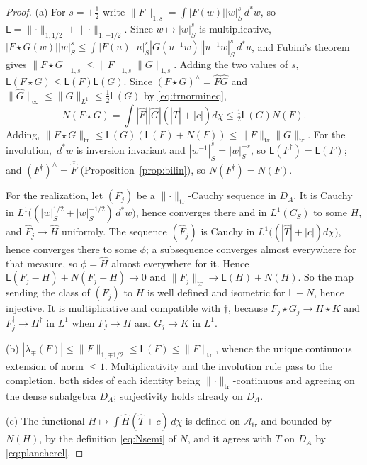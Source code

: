 \documentclass[11pt]{amsart}
\theoremstyle{definition}
\theoremstyle{remark}
\newcommand{\dstar}{\,d^{*}}
\newcommand{\Th}{\widehat{T}}
\newcommand{\DA}{D_A}
\begin{document}
\begin{proof}
(a)  For $s=\pm\tfrac12$ write
$\lVert F\rVert_{1,s}=\int|F(w)||w|_S^{s}\dstar w$, so
$\mathsf L=\lVert\cdot\rVert_{1,1/2}+\lVert\cdot\rVert_{1,-1/2}$.  Since
$w\mapsto|w|_S^{s}$ is multiplicative,
$|F\star G(w)||w|_S^{s}\le\int|F(u)||u|_S^{s}|G(u^{-1}w)|
|u^{-1}w|_S^{s}\dstar u$,
and Fubini's theorem gives
$\lVert F\star G\rVert_{1,s}\le\lVert F\rVert_{1,s}
\lVert G\rVert_{1,s}$.  Adding the two values of $s$,
$\mathsf L(F\star G)\le\mathsf L(F)\mathsf L(G)$.  Since $(F\star G)^{\wedge}=
\widehat F\widehat G$ and $\lVert\widehat G\rVert_{\infty}\le\lVert
G\rVert_{L^{1}}\le\tfrac12\mathsf L(G)$ by \eqref{eq:trnormineq},
\[
N(F\star G)=\int|\widehat F||\widehat G|(|\Th|+|c|)d\chi
\le\tfrac12\mathsf L(G)N(F).
\]
Adding, $\lVert F\star G\rVert_{\mathrm{tr}}\le\mathsf L(G)
(\mathsf L(F)+N(F))\le\lVert F\rVert_{\mathrm{tr}}\lVert G\rVert_{\mathrm{tr}}$.
For the involution, $\dstar w$ is inversion invariant and
$|w^{-1}|_S^{s}=|w|_S^{-s}$, so $\mathsf L(F^{\dagger})=\mathsf L(F)$;
and $(F^{\dagger})^{\wedge}=\overline{\widehat F}$
(Proposition~\ref{prop:bilin}), so $N(F^{\dagger})=N(F)$.

For the realization, let $(F_j)$ be a
$\lVert\cdot\rVert_{\mathrm{tr}}$-Cauchy sequence in $\DA$.  It is Cauchy in
$L^{1}\bigl((|w|_S^{1/2}+|w|_S^{-1/2})\dstar w\bigr)$, hence converges there
and in $L^{1}(C_S)$ to some $H$, and $\widehat F_j\to\widehat H$ uniformly.
The sequence $(\widehat F_j)$ is Cauchy in
$L^{1}\bigl((|\Th|+|c|)d\chi\bigr)$, hence converges there to some $\phi$; a
subsequence converges almost everywhere for that measure, so
$\phi=\widehat H$ almost everywhere for it.  Hence
$\mathsf L(F_j-H)+N(F_j-H)\to0$ and
$\lVert F_j\rVert_{\mathrm{tr}}\to\mathsf L(H)+N(H)$.  So the map sending the
class of $(F_j)$ to $H$ is well defined and isometric for $\mathsf L+N$, hence
injective.  It is multiplicative and compatible with $\dagger$, because
$F_j\star G_j\to H\star K$ and $F_j^{\dagger}\to H^{\dagger}$ in $L^{1}$ when
$F_j\to H$ and $G_j\to K$ in $L^{1}$.

(b)  $|\lambda_{\mp}(F)|\le\lVert F\rVert_{1,\mp1/2}\le\mathsf L(F)\le
\lVert F\rVert_{\mathrm{tr}}$, whence the unique continuous extension of norm
$\le1$.  Multiplicativity and the involution rule pass to the completion,
both sides of each identity being $\lVert\cdot\rVert_{\mathrm{tr}}$-continuous
and agreeing on the dense subalgebra $\DA$; surjectivity holds already on
$\DA$.

(c)  The functional $H\mapsto\int\widehat H(\Th+c)\,d\chi$ is defined on
$\mathcal A_{\mathrm{tr}}$ and bounded by $N(H)$, by the definition \eqref{eq:Nsemi} of $N$, and
it agrees with $T$ on $\DA$ by \eqref{eq:plancherel}.


\end{proof}
\end{document}
